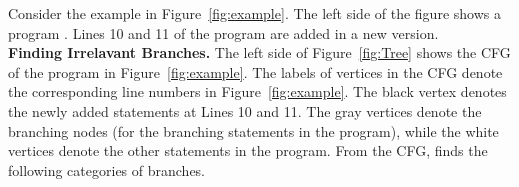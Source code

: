 Consider the example in Figure~\ref{fig:example}. 
The left side of the figure shows a program . Lines 10 and 11 of the program are added in a new version.
\\ \textbf{Finding Irrelavant Branches.} 
The left side of Figure~\ref{fig:Tree} shows the CFG of the program in Figure~\ref{fig:example}. The labels of vertices in the CFG denote the corresponding line numbers in Figure~\ref{fig:example}. The black vertex denotes the newly added statements at Lines 10 and 11. The gray vertices denote the branching nodes (for the branching statements in the program), while the white vertices denote the other statements in the program. From the CFG,  finds the following categories of branches.
